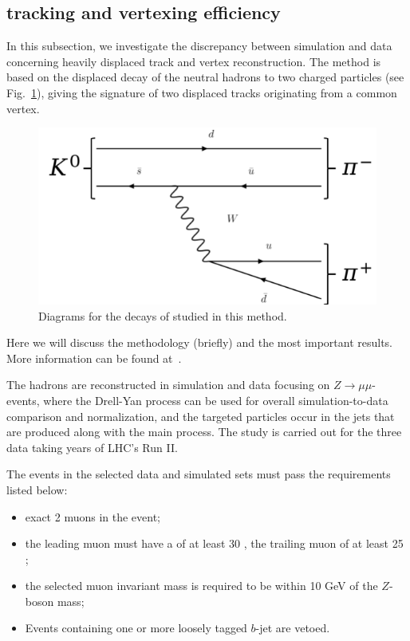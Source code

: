 \subsection{\Displ tracking and vertexing efficiency}
\label{sec:displacedvertex}

In this subsection, we investigate the discrepancy between simulation
and data concerning heavily displaced track and vertex
reconstruction. 
The method is based on the displaced decay of the
neutral hadrons \PKzS to two charged particles (see
Fig.~\ref{fig:diagrams}), giving the signature of two displaced tracks
originating from a common vertex.
\begin{figure}
    \includegraphics[width=0.9\linewidth]{Figures/c6/efficiencies/diagram_ks}
    \caption{Diagrams for the decays of \PKzS studied in this method.}
    \label{fig:diagrams}
\end{figure}
 Here we will discuss the methodology
(briefly) and the most important results. More information can be found at~\cite{AN-20-111_KshortStudy}.

The \PKzS hadrons are reconstructed in simulation and data focusing on $Z\rightarrow \mu\mu$-events, where the Drell-Yan process can be used for overall simulation-to-data comparison and normalization, and the targeted particles occur in the jets that are produced along with the main process. The study is carried out for the three data taking years of LHC's Run II.

\noindent The events in the selected data and simulated sets must pass the requirements listed below:
\begin{itemize}
\setlength\itemsep{-0.2em}
    \item exact 2 muons in the event;
    \item the leading muon must have a \pt of at least 30 \GeV, the trailing muon of at least 25 \GeV;
    \item the selected muon invariant mass is required to be within 10 GeV of the $Z$-boson mass;
    \item Events containing one or more loosely tagged $b$-jet are vetoed.
\end{itemize}

